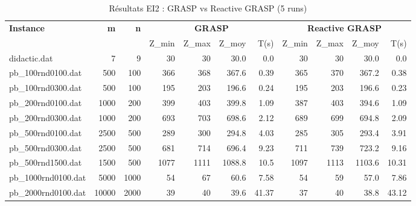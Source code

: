 \begin{table}[htbp]
\centering
\caption{Résultats EI2 : GRASP vs Reactive GRASP (5 runs)}
\label{tab:ei2}
\small
\begin{tabular}{|l|rr|rrrr|rrrr|}
\hline
\textbf{Instance} & \textbf{m} & \textbf{n} & \multicolumn{4}{c|}{\textbf{GRASP}} & \multicolumn{4}{c|}{\textbf{Reactive GRASP}} \\
& & & Z_{min} & Z_{max} & Z_{moy} & T(s) & Z_{min} & Z_{max} & Z_{moy} & T(s) \\
\hline
didactic.dat & 7 & 9 & 30 & 30 & 30.0 & 0.0 & 30 & 30 & 30.0 & 0.0 \\
pb\_100rnd0100.dat & 500 & 100 & 366 & 368 & 367.6 & 0.39 & 365 & 370 & 367.2 & 0.38 \\
pb\_100rnd0300.dat & 500 & 100 & 195 & 203 & 196.6 & 0.24 & 195 & 203 & 196.6 & 0.23 \\
pb\_200rnd0100.dat & 1000 & 200 & 399 & 403 & 399.8 & 1.09 & 387 & 403 & 394.6 & 1.09 \\
pb\_200rnd0300.dat & 1000 & 200 & 693 & 703 & 698.6 & 2.12 & 689 & 699 & 694.8 & 2.09 \\
pb\_500rnd0100.dat & 2500 & 500 & 289 & 300 & 294.8 & 4.03 & 285 & 305 & 293.4 & 3.91 \\
pb\_500rnd0300.dat & 2500 & 500 & 681 & 714 & 696.4 & 9.23 & 711 & 739 & 723.2 & 9.16 \\
pb\_500rnd1500.dat & 1500 & 500 & 1077 & 1111 & 1088.8 & 10.5 & 1097 & 1113 & 1103.6 & 10.31 \\
pb\_1000rnd0100.dat & 5000 & 1000 & 54 & 67 & 60.6 & 7.58 & 54 & 59 & 57.0 & 7.86 \\
pb\_2000rnd0100.dat & 10000 & 2000 & 39 & 40 & 39.6 & 41.37 & 37 & 40 & 38.8 & 43.12 \\
\hline
\end{tabular}
\end{table}

